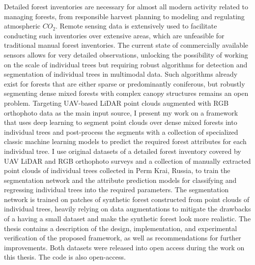 Detailed forest inventories are necessary for almost all modern activity related to managing forests, from responsible harvest planning to modeling and regulating atmospheric $CO_2$.
Remote sensing data is extensively used to facilitate conducting such inventories over extensive areas, which are unfeasible for traditional manual forest inventories.
The current state of commercially available sensors allows for very detailed observations, unlocking the possibility of working on the scale of individual trees but requiring robust algorithms for detection and segmentation of individual trees in multimodal data.
Such algorithms already exist for forests that are either sparse or predominantly coniferous, but robustly segmenting dense mixed forests with complex canopy structures remains an open problem.
Targeting UAV-based LiDAR point clouds augmented with RGB orthophoto data as the main input source, I present my work on a framework that uses deep learning to segment point clouds over dense mixed forests into individual trees and post-process the segments with a collection of specialized classic machine learning models to predict the required forest attributes for each individual tree.
I use original datasets of a detailed forest inventory covered by UAV LiDAR and RGB orthophoto surveys and a collection of manually extracted point  clouds of individual trees collected in Perm Krai, Russia, to train the segmentation network and the attribute prediction models for classifying and regressing individual trees into the required parameters.
The segmentation network is trained on patches of synthetic forest constructed from point clouds of individual trees, heavily relying on data augmentations to mitigate the drawbacks of a having a small dataset and make the synthetic forest look more realistic.
The thesis contains a description of the design, implementation, and experimental verification of the proposed framework, as well as recommendations for further improvements.
Both datasets were released into open access during the work on this thesis.
The code is also open-access.
